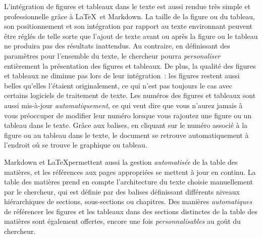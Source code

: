\documentclass[
  letterpaper,
  DIV=11,
  numbers=noendperiod]{scrreprt}
\begin{document}
L'intégration de figures et tableaux dans le texte est aussi rendue très
simple et professionnelle grâce à \LaTeX~et Markdown. La taille de la
figure ou du tableau, son positionnement et son intégration par rapport
au texte environnant peuvent être réglés de telle sorte que l'ajout de
texte avant ou après la figure ou le tableau ne produira pas des
résultats inattendus. Au contraire, en définissant des paramètres pour
l'ensemble du texte, le chercheur pourra \emph{personaliser} entièrement
la présentation des figures et tableaux. De plus, la qualité des figures
et tableaux ne diminue pas lors de leur intégration~: les figures
restent aussi belles qu'elles l'étaient originalement, ce qui n'est pas
toujours le cas avec certains logiciels de traitement de texte. Les
numéros des figures et tableaux sont aussi mis-à-jour
\emph{automatiquement}, ce qui veut dire que vous n'aurez jamais à vous
préoccuper de modifier leur numéro lorsque vous rajoutez une figure ou
un tableau dans le texte. Grâce aux balises, en cliquant sur le numéro
associé à la figure ou au tableau dans le texte, le document se retrouve
automatiquement à l'endroit où se trouve le graphique ou tableau.

Markdown et \LaTeX permettent aussi la gestion \emph{automatisée} de la
table des matières, et les références aux pages appropriées se mettent à
jour en continu. La table des matières prend en compte l'architecture du
texte choisie manuellement par le chercheur, qui est définie par des
balises définissant différents niveaux hiérarchiques de sections,
sous-sections ou chapitres. Des manières \emph{automatiques} de
référencer les figures et les tableaux dans des sections distinctes de
la table des matières sont également offertes, encore une fois
\emph{personnalisables} au goût du chercheur.
\end{document}
